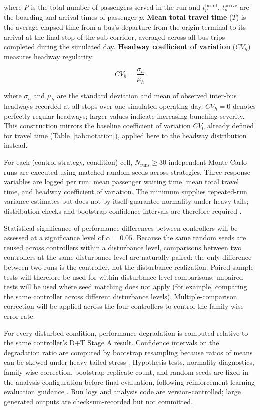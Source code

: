 where $P$ is the total number of passengers served in the run and $t_p^{\text{board}}$, $t_p^{\text{arrive}}$ are the boarding and arrival times of passenger $p$. \textbf{Mean total travel time} ($\bar{T}$) is the average elapsed time from a bus's departure from the origin terminal to its arrival at the final stop of the sub-corridor, averaged across all bus trips completed during the simulated day. \textbf{Headway coefficient of variation} ($CV_h$) measures headway regularity:

\begin{equation}
CV_h = \frac{\sigma_h}{\mu_h}
\label{eq:headway_cv}
\end{equation}

where $\sigma_h$ and $\mu_h$ are the standard deviation and mean of observed inter-bus headways recorded at all stops over one simulated operating day. $CV_h = 0$ denotes perfectly regular headways; larger values indicate increasing bunching severity. This construction mirrors the baseline coefficient of variation $CV_0$ already defined for travel time (Table~\ref{tab:notation}), applied here to the headway distribution instead.

For each (control strategy, condition) cell, $N_{\mathrm{runs}} \geq 30$ independent Monte Carlo runs are executed using matched random seeds across strategies. Three response variables are logged per run: mean passenger waiting time, mean total travel time, and headway coefficient of variation. The minimum supplies repeated-run variance estimates but does not by itself guarantee normality under heavy tails; distribution checks and bootstrap confidence intervals are therefore required \cite{Wasserman2004,Agarwal2021Precipice}.

Statistical significance of performance differences between controllers will be assessed at a significance level of $\alpha = 0.05$. Because the same random seeds are reused across controllers within a disturbance level, comparisons between two controllers at the same disturbance level are naturally paired: the only difference between two runs is the controller, not the disturbance realization. Paired-sample tests will therefore be used for within-disturbance-level comparisons; unpaired tests will be used where seed matching does not apply (for example, comparing the same controller across different disturbance levels). Multiple-comparison correction will be applied across the four controllers to control the family-wise error rate.

For every disturbed condition, performance degradation is computed relative to the same controller's D+T Stage A result. Confidence intervals on the degradation ratio are computed by bootstrap resampling because ratios of means can be skewed under heavy-tailed stress \cite{EfronTibshirani1993}. Hypothesis tests, normality diagnostics, family-wise correction, bootstrap replicate count, and random seeds are fixed in the analysis configuration before final evaluation, following reinforcement-learning evaluation guidance \cite{Henderson2018Matters,Agarwal2021Precipice}. Run logs and analysis code are version-controlled; large generated outputs are checksum-recorded but not committed.

